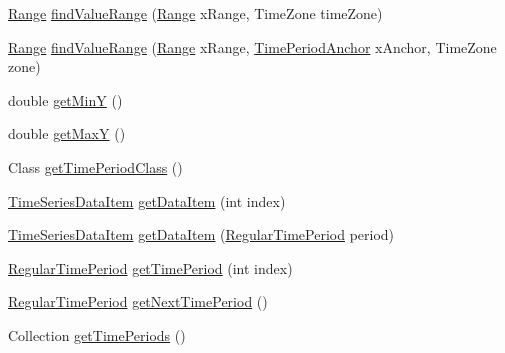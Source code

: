 \begin{DoxyCompactItemize}
\item 
\mbox{\hyperlink{classorg_1_1jfree_1_1data_1_1_range}{Range}} \mbox{\hyperlink{classorg_1_1jfree_1_1data_1_1time_1_1_time_series_a95cf979396bdbd79d826679594769d1d}{find\+Value\+Range}} (\mbox{\hyperlink{classorg_1_1jfree_1_1data_1_1_range}{Range}} x\+Range, Time\+Zone time\+Zone)
\item 
\mbox{\hyperlink{classorg_1_1jfree_1_1data_1_1_range}{Range}} \mbox{\hyperlink{classorg_1_1jfree_1_1data_1_1time_1_1_time_series_a06dbb6336efea97fcceed8f1a15bfbae}{find\+Value\+Range}} (\mbox{\hyperlink{classorg_1_1jfree_1_1data_1_1_range}{Range}} x\+Range, \mbox{\hyperlink{classorg_1_1jfree_1_1data_1_1time_1_1_time_period_anchor}{Time\+Period\+Anchor}} x\+Anchor, Time\+Zone zone)
\item 
double \mbox{\hyperlink{classorg_1_1jfree_1_1data_1_1time_1_1_time_series_a5ec14c92abfbd1acd91d2004c574ce88}{get\+MinY}} ()
\item 
double \mbox{\hyperlink{classorg_1_1jfree_1_1data_1_1time_1_1_time_series_a7b8dddcabcd0c9e583ea043357d8f30a}{get\+MaxY}} ()
\item 
Class \mbox{\hyperlink{classorg_1_1jfree_1_1data_1_1time_1_1_time_series_a2915da3eb3aa085103b543773e7d91f5}{get\+Time\+Period\+Class}} ()
\item 
\mbox{\hyperlink{classorg_1_1jfree_1_1data_1_1time_1_1_time_series_data_item}{Time\+Series\+Data\+Item}} \mbox{\hyperlink{classorg_1_1jfree_1_1data_1_1time_1_1_time_series_a9025d2287a71b6e86fdfb9eb68c07042}{get\+Data\+Item}} (int index)
\item 
\mbox{\hyperlink{classorg_1_1jfree_1_1data_1_1time_1_1_time_series_data_item}{Time\+Series\+Data\+Item}} \mbox{\hyperlink{classorg_1_1jfree_1_1data_1_1time_1_1_time_series_ac47fe1aa76133646f441233ccb6c95bd}{get\+Data\+Item}} (\mbox{\hyperlink{classorg_1_1jfree_1_1data_1_1time_1_1_regular_time_period}{Regular\+Time\+Period}} period)
\item 
\mbox{\hyperlink{classorg_1_1jfree_1_1data_1_1time_1_1_regular_time_period}{Regular\+Time\+Period}} \mbox{\hyperlink{classorg_1_1jfree_1_1data_1_1time_1_1_time_series_aa66c43272282abd50947c39b4bfc8576}{get\+Time\+Period}} (int index)
\item 
\mbox{\hyperlink{classorg_1_1jfree_1_1data_1_1time_1_1_regular_time_period}{Regular\+Time\+Period}} \mbox{\hyperlink{classorg_1_1jfree_1_1data_1_1time_1_1_time_series_a1527c3a267e42abf6f0cb6a5088061c1}{get\+Next\+Time\+Period}} ()
\item 
Collection \mbox{\hyperlink{classorg_1_1jfree_1_1data_1_1time_1_1_time_series_a15f14354046115a1ddbf479eaf6192fb}{get\+Time\+Periods}} ()

\end{DoxyCompactItemize}

